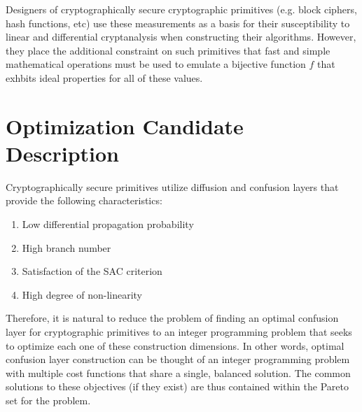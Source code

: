 \documentclass[11pt]{article}
\begin{document}
Designers of cryptographically secure cryptographic primitives (e.g. block ciphers, hash functions, etc) use these measurements as a basis for their susceptibility to linear and differential cryptanalysis when constructing their algorithms. However, they place the additional constraint on such primitives that fast and simple mathematical operations must be used to emulate a bijective function $f$ that exhbits ideal properties for all of these values.


\section{Optimization Candidate Description}
Cryptographically secure primitives utilize diffusion and confusion layers that provide the following characteristics:

\begin{enumerate}
	\item Low differential propagation probability
	\item High branch number
	\item Satisfaction of the SAC criterion
	\item High degree of non-linearity
\end{enumerate}

Therefore, it is natural to reduce the problem of finding an optimal confusion layer for cryptographic primitives to an integer programming problem that seeks to optimize each one of these construction dimensions. In other words, optimal confusion layer construction can be thought of an integer programming problem with multiple cost functions that share a single, balanced solution. The common solutions to these objectives (if they exist) are thus contained within the Pareto set for the problem.
\end{document}
